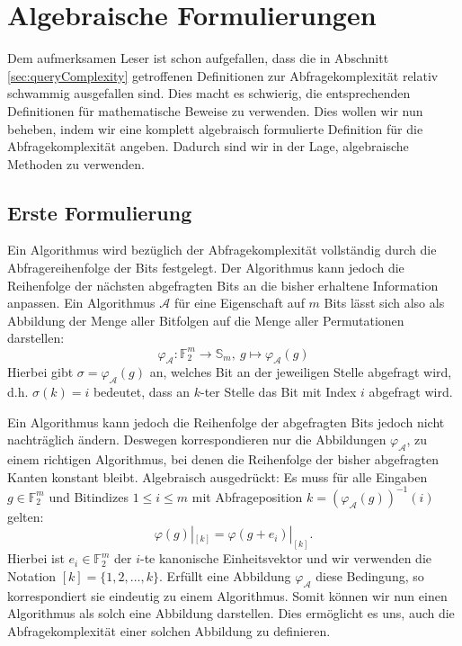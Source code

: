 \documentclass[10pt,a4paper, footheight=1mm]{scrreprt}
\theoremstyle{definition}
\begin{document}
\section{Algebraische Formulierungen}
Dem aufmerksamen Leser ist schon aufgefallen, dass die in 
Abschnitt \ref{sec:queryComplexity} getroffenen Definitionen
zur Abfragekomplexität relativ schwammig ausgefallen sind.
Dies macht es schwierig, die entsprechenden Definitionen
für mathematische Beweise zu verwenden.
Dies wollen wir nun beheben, indem wir eine komplett algebraisch
formulierte Definition für die Abfragekomplexität angeben.
Dadurch sind wir in der Lage, algebraische Methoden zu verwenden.

\subsection{Erste Formulierung}
\label{sec:AlgebraischeCharakterisierung}
Ein Algorithmus wird bezüglich der Abfragekomplexität vollständig
durch die Abfragereihenfolge der Bits festgelegt.
Der Algorithmus kann jedoch die Reihenfolge der nächsten
abgefragten Bits an die bisher erhaltene Information anpassen.
Ein Algorithmus $\mathcal{A}$ für eine Eigenschaft
auf $m$ Bits lässt sich also als Abbildung der Menge aller
Bitfolgen auf die Menge aller Permutationen darstellen:
$$ \varphi_\mathcal{A}: \mathbb{F}_2^m \to \mathbb{S}_m,
   ~g \mapsto \varphi_\mathcal{A}(g)$$
Hierbei gibt $\sigma = \varphi_\mathcal{A}(g)$ an, welches
Bit an der jeweiligen Stelle abgefragt wird,
d.h. $\sigma(k)=i$ bedeutet, dass an $k$-ter
Stelle das Bit mit Index $i$ abgefragt wird.

Ein Algorithmus kann jedoch die Reihenfolge der 
abgefragten Bits jedoch nicht nachträglich ändern. Deswegen
korrespondieren nur die Abbildungen $\varphi_\mathcal{A}$,
zu einem richtigen Algorithmus, bei denen die Reihenfolge
der bisher abgefragten Kanten konstant bleibt.
Algebraisch ausgedrückt: Es muss für alle Eingaben
$g\in \mathbb{F}_2^m$ und Bitindizes $1\leq i \leq m$
mit Abfrageposition $k=(\varphi_\mathcal{A}(g))^{-1}(i)$
gelten:
\begin{equation}
\label{eq:NichtNachtraeglichAendern}
\varphi(g)|_{[k]} = \varphi(g+e_i)|_{[k]}.
\end{equation}
Hierbei ist $e_i\in \mathbb{F}_2^m$
der $i$-te kanonische Einheitsvektor
und wir verwenden die Notation $[k]=\{1,2, \dots, k\}$.
Erfüllt eine Abbildung $\varphi_\mathcal{A}$ diese
Bedingung, so korrespondiert sie eindeutig
zu einem Algorithmus. Somit können wir nun
einen Algorithmus als solch eine Abbildung darstellen.
Dies ermöglicht es uns, auch die Abfragekomplexität
einer solchen Abbildung zu definieren.
\end{document}
